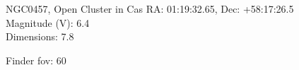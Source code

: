 \begin{block}{NGC0457, Open Cluster in Cas}
    RA: 01:19:32.65, Dec: +58:17:26.5 \\ 
    Magnitude (V): 6.4 \\ 
    Dimensions: 7.8 

    Finder fov: 60 
\end{block}